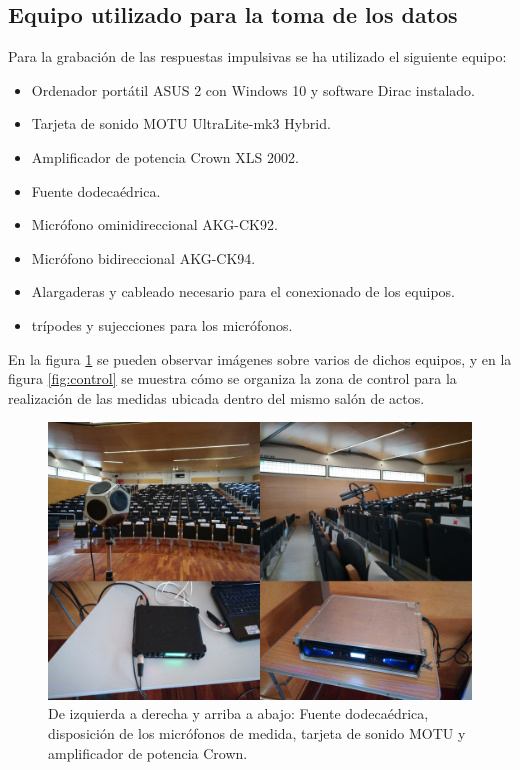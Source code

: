 \documentclass[11pt,a4paper,twoside]{book}
\begin{document}
	    \subsection{Equipo utilizado para la toma de los datos}
	        Para la grabación de las respuestas impulsivas se ha utilizado el siguiente equipo:
	        \begin{itemize}
	            \item Ordenador portátil ASUS 2 con Windows 10 y software Dirac instalado.
	            \item Tarjeta de sonido MOTU UltraLite-mk3 Hybrid.
	            \item Amplificador de potencia Crown XLS 2002.
	            \item Fuente dodecaédrica.
	            \item Micrófono ominidireccional AKG-CK92.
	            \item Micrófono bidireccional AKG-CK94.
	            \item Alargaderas y cableado necesario para el conexionado de los equipos.
	            \item trípodes y sujecciones para los micrófonos.
	        
	        \end{itemize}
	    
	        En la figura \ref{fig:equipos} se pueden observar imágenes sobre varios de dichos equipos, y en la figura \ref{fig:control} se muestra cómo se organiza la zona de control para la realización de las medidas ubicada dentro del mismo salón de actos.
	    
	        \begin{figure}
	            \includegraphics[scale=0.6]{../imagenes/equipos.jpg}
			    \centering
			    \caption{De izquierda a derecha y arriba a abajo: Fuente dodecaédrica, disposición de los micrófonos de medida, tarjeta de sonido MOTU y amplificador de potencia Crown.}
			    \label{fig:equipos}
	        \end{figure}
	    
\end{document}
